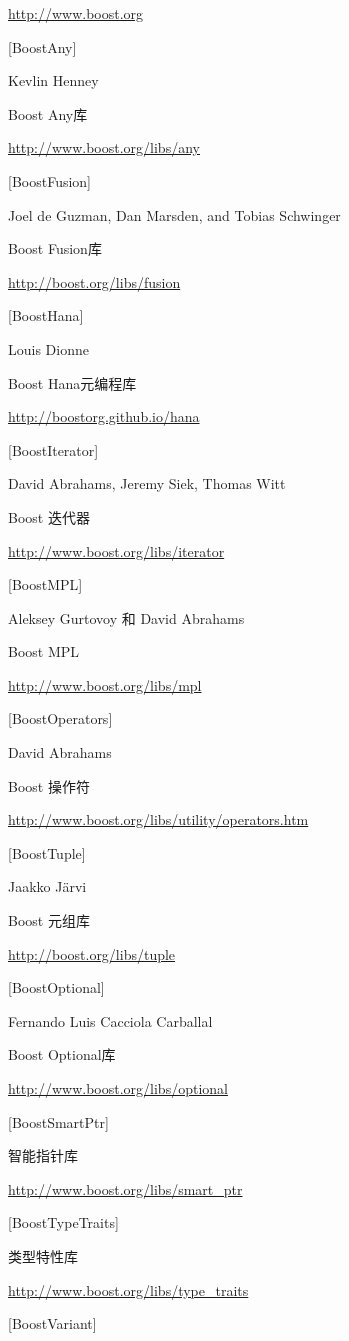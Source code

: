 \url{http://www.boost.org}

{[BoostAny]}

Kevlin Henney

Boost Any库

\url{http://www.boost.org/libs/any}

{[BoostFusion]}

Joel de Guzman, Dan Marsden, and Tobias Schwinger

Boost Fusion库

\url{http://boost.org/libs/fusion}

{[BoostHana]}

Louis Dionne

Boost Hana元编程库

\url{http://boostorg.github.io/hana}

{[BoostIterator]}

David Abrahams, Jeremy Siek, Thomas Witt

Boost 迭代器

\url{http://www.boost.org/libs/iterator}

{[BoostMPL]}

Aleksey Gurtovoy 和 David Abrahams

Boost MPL

\url{http://www.boost.org/libs/mpl}

{[BoostOperators]}

David Abrahams

Boost 操作符

\url{http://www.boost.org/libs/utility/operators.htm}

{[BoostTuple]}

Jaakko J{\"a}rvi

Boost 元组库

\url{http://boost.org/libs/tuple}

{[BoostOptional]}

Fernando Luis Cacciola Carballal

Boost Optional库

\url{http://www.boost.org/libs/optional}

{[BoostSmartPtr]}

智能指针库

\url{http://www.boost.org/libs/smart_ptr}

{[BoostTypeTraits]}

类型特性库

\url{http://www.boost.org/libs/type_traits}

{[BoostVariant]}

